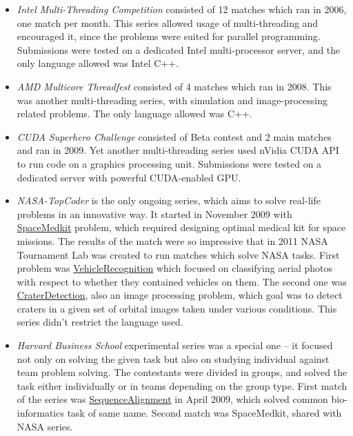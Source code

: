 \begin{itemize}
\item
  \emph{Intel Multi-Threading Competition }consisted of 12 matches which
  ran in 2006, one match per month. This series allowed usage of
  multi-threading and encouraged it, since the problems were suited for
  parallel programming. Submissions were tested on a dedicated Intel
  multi-processor server, and the only language allowed was Intel C++.
\item
  \emph{AMD Multicore Threadfest} consisted of 4 matches which ran in
  2008. This was another multi-threading series, with simulation and
  image-processing related problems. The only language allowed was C++.
\item
  \emph{CUDA Superhero Challenge} consisted of Beta contest and 2 main
  matches and ran in 2009. Yet another multi-threading series used
  nVidia CUDA API to run code on a graphics processing unit. Submissions
  were tested on a dedicated server with powerful CUDA-enabled GPU.
\item
  \emph{NASA-TopCoder} is the only ongoing series, which aims to solve
  real-life problems in an innovative way. It started in November 2009
  with
  \href{http://community.topcoder.com/longcontest/?module=ViewProblemStatement\&rd=14002\&pm=10680}{SpaceMedkit}
  problem, which required designing optimal medical kit for space
  missions. The results of the match were so impressive that in 2011
  NASA Tournament Lab was created to run matches which solve NASA tasks.
  First problem was
  \href{http://community.topcoder.com/longcontest/?module=ViewProblemStatement\&rd=14481\&pm=11313}{VehicleRecognition}
  which focused on classifying aerial photos with respect to whether
  they contained vehicles on them. The second one was
  \href{http://community.topcoder.com/longcontest/?module=ViewProblemStatement\&rd=14570\&pm=11457}{CraterDetection},
  also an image processing problem, which goal was to detect craters in
  a given set of orbital images taken under various conditions. This
  series didn't restrict the language used.
\item
  \emph{Harvard Business School} experimental series was a special one
  -- it focused not only on solving the given task but also on studying
  individual against team problem solving. The contestants were divided
  in groups, and solved the task either individually or in teams
  depending on the group type. First match of the series was
  \href{http://community.topcoder.com/longcontest/?module=ViewProblemStatement\&rd=13796\&pm=10390}{SequenceAlignment}
  in April 2009, which solved common bio-informatics task of same name.
  Second match was SpaceMedkit, shared with NASA series.
\end{itemize}

